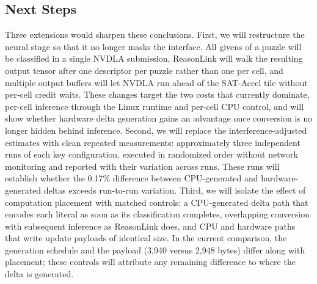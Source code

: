 \documentclass[conference,10pt,letterpaper]{IEEEtran}
\begin{document}
\subsection{Next Steps}
Three extensions would sharpen these conclusions. First, we will restructure the neural stage so that it no longer masks the interface. All givens of a puzzle will be classified in a single NVDLA submission, ReasonLink will walk the resulting output tensor after one descriptor per puzzle rather than one per cell, and multiple output buffers will let NVDLA run ahead of the SAT-Accel tile without per-cell credit waits. These changes target the two costs that currently dominate, per-cell inference through the Linux runtime and per-cell CPU control, and will show whether hardware delta generation gains an advantage once conversion is no longer hidden behind inference. Second, we will replace the interference-adjusted estimates with clean repeated measurements: approximately three independent runs of each key configuration, executed in randomized order without network monitoring and reported with their variation across runs. These runs will establish whether the 0.17\% difference between CPU-generated and hardware-generated deltas exceeds run-to-run variation. Third, we will isolate the effect of computation placement with matched controls: a CPU-generated delta path that encodes each literal as soon as its classification completes, overlapping conversion with subsequent inference as ReasonLink does, and CPU and hardware paths that write update payloads of identical size. In the current comparison, the generation schedule and the payload (3,940 versus 2,948 bytes) differ along with placement; these controls will attribute any remaining difference to where the delta is generated.





\appendices

\end{document}
